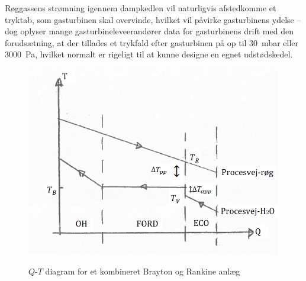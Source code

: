 Røggassens strømning igennem dampkedlen vil naturligvis afstedkomme et tryktab, som gasturbinen skal overvinde, hvilket vil påvirke gasturbinens ydelse -- dog oplyser mange gasturbineleveerandører data for gasturbinens drift med den forudsætning, at der tillades et trykfald efter gasturbinen på op til \qty{30}{mbar} eller \qty{3000}{Pa}, hvilket normalt er rigeligt til at kunne designe en egnet udstødskedel.

\begin{figure} [ht]
  \centering
  \caption{$Q$-$T$ diagram for et kombineret Brayton og Rankine anlæg}
  \includegraphics[width=0.5\linewidth]{./figures/f7_10.png}
  \label{fig:f7_10}
\end{figure}

